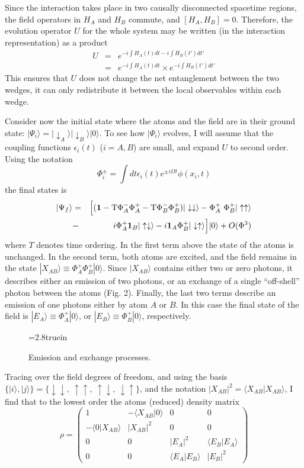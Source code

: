 \documentclass[12pt]{article}
\newcommand{\beq}{\begin{equation}}
\newcommand{\eeq}{\end{equation}}
\newcommand{\beqa}{\begin{eqnarray}}
\newcommand{\eeqa}{\end{eqnarray}}
\def \la {\langle}
\def \ra {\rangle}
\def \up {\uparrow}
\def \down {\downarrow}
\begin{document}
Since the interaction takes place in two causally
disconnected spacetime regions, the field
operators in $H_A$ and $H_B$ commute, and $[H_A, H_{B}]=0$.
Therefore, the evolution operator $U$ for the whole system
may be written (in the interaction representation) as
a product
\beqa
U  &=&  e^{-i\int H_A(t)dt -i\int H_B(t')dt'} \nonumber \\
&=& e^{-i\int H_A(t) dt } \times e^{-i\int H_B(t') dt'}
\eeqa
This ensures that $U$
does not change the net entanglement between the two wedges,
it can only redistribute it between the local observables within
each wedge.


Consider now the initial state where the atoms and the field
are in their ground state: $|\Psi_i\ra =|\down_A\ra|\down_B\ra |0\ra$.
To see how $|\Psi_i\ra$ evolves, I will assume that
the coupling functions $\epsilon_i(t)$ ($i=A,B$) are small, and expand
$U$ to second order. Using the notation
\beq
\Phi_i^\pm = \int dt\epsilon_i(t)e^{\pm i\Omega t}\phi(x_i,t)
\eeq
the final states is
\beqa
|\Psi_f\ra
&=&\Bigl[({\bf 1} - {\rm T}\Phi^-_A\Phi_A^+
- {\rm T}\Phi^-_B\Phi_B^+)|\down\down\ra
- \Phi^+_A\  \Phi^+_B|\up\up\ra
\nonumber \\
&-&i\Phi^+_A {\bf 1}_B|\up\down\ra -
i{\bf 1}_A \Phi^+_B|\down\up\ra \Bigr]|0\ra + O(\Phi^3)
\eeqa
where $T$ denotes time ordering.
In the first term above the state of the atoms is
unchanged.
In the second term, both atoms are excited, and the
field remains in the state $|X_{AB}\ra\equiv \Phi^+_A\Phi^+_B|0\ra$.
Since $|X_{AB}\ra$ contains either two or zero photons, it
describes
either an emission of two photons, or an exchange of a single
``off-shell'' photon between the atoms (Fig. 2).
Finally, the last two terms describe an emission of one photons
either by atom $A$ or $B$.
In this case the final state of
the field is $|E_A\ra\equiv \Phi^+_A|0\ra$, or $|E_B\ra\equiv
\Phi_B^+|0\ra$, respectively.

\begin{figure} \epsfxsize=2.8truein
      \centerline{}
  \caption[]{Emission and exchange processes. }
    \label{graphs} \end{figure}

Tracing over the field degrees of freedom,
and using the basis
$\{|i\ra,|j\ra \}= \{ \down\down, \ \up\up,\ \up\down, \ \down\up\}$,
and the notation $|X_{AB}|^2 = \la X_{AB}|X_{AB}\ra$,
I find that to the lowest order
the atoms (reduced) density matrix
\beq
\rho=
\left(
\begin{array}{cccc}
1   & - \la X_{AB}|0\ra & 0  & 0 \\
-\la 0|X_{AB}\ra  & |X_{AB}|^2  & 0  & 0\\
0 & 0 &      |E_{A}|^2  &  \la E_B|E_A\ra    \\
0 & 0 & \la E_A|E_B\ra  &  |E_B|^2
\end{array} \right)
\label{density}
\eeq
\end{document}
